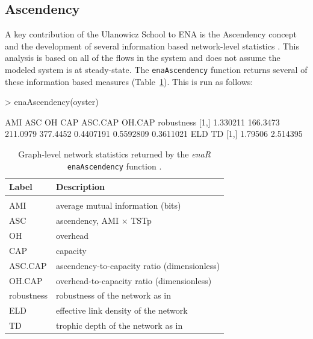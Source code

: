 \documentclass[article]{jss}
\begin{document}
\subsection{Ascendency}

A key contribution of the Ulanowicz School to ENA is the Ascendency
concept and the development of several information based network-level
statistics \citep{ulanowicz86, ulanowicz97}.  This analysis is based
on all of the flows in the system and does not assume the modeled
system is at steady-state.  The \texttt{enaAscendency} function
returns several of these information based measures
(Table~\ref{tab:asc}).  This is run as follows:

\begin{Schunk}
\begin{Sinput}
>   enaAscendency(oyster)
\end{Sinput}
\begin{Soutput}
          AMI      ASC       OH      CAP   ASC.CAP    OH.CAP robustness
[1,] 1.330211 166.3473 211.0979 377.4452 0.4407191 0.5592809  0.3611021
         ELD       TD
[1,] 1.79506 2.514395
\end{Soutput}
\end{Schunk}

\begin{table}[t]
  \caption{Graph-level network statistics returned by the \textit{enaR}
    \texttt{enaAscendency} function \citep[see][for
    interpretations]{ulanowicz86, ulanowicz97}.}\label{tab:asc}
  \center
  \begin{small}
    \begin{tabularx}{\textwidth}{l l}
      \textbf{Label} & \textbf{Description} \\ \hline \\[-1.5ex]
      AMI & average mutual information (bits) \\
      ASC & ascendency, AMI $\times$ TSTp \\
      OH & overhead \\
      CAP& capacity \\
      ASC.CAP& ascendency-to-capacity ratio (dimensionless)\\
      OH.CAP& overhead-to-capacity ratio (dimensionless)\\
      robustness & robustness of the network as in \citet{fath2014quantifying} \\
      ELD & effective link density of the network \citet{ulanowicz2014}\\
      TD & trophic depth of the network as in \citet{ulanowicz2014} \\
      \hline
    \end{tabularx}
  \end{small}
\end{table}
\end{document}
